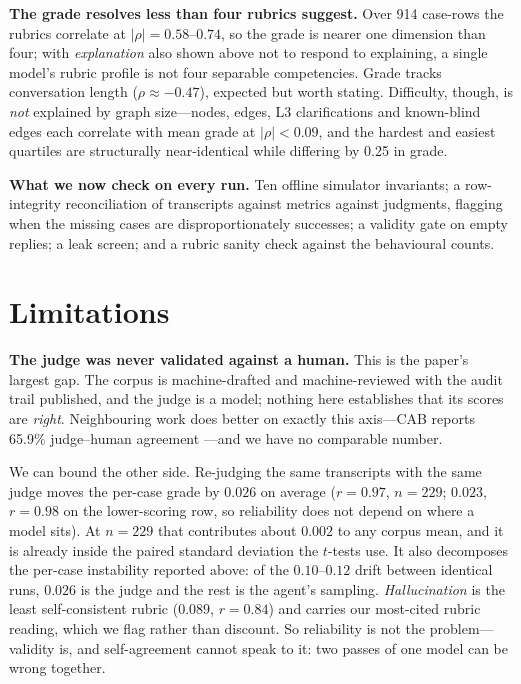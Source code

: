 \documentclass{article} %
\begin{document}
\textbf{The grade resolves less than four rubrics suggest.} Over 914
case-rows the rubrics correlate at $|\rho| = 0.58$--$0.74$, so the grade
is nearer one dimension than four; with \emph{explanation} also shown
above not to respond to explaining, a single model's rubric profile is
not four separable competencies. Grade tracks conversation length
($\rho \approx -0.47$), expected but worth stating. Difficulty, though,
is \emph{not} explained by graph size---nodes, edges, L3 clarifications
and known-blind edges each correlate with mean grade at $|\rho| < 0.09$,
and the hardest and easiest quartiles are structurally near-identical
while differing by 0.25 in grade.

\textbf{What we now check on every run.} Ten offline simulator
invariants; a row-integrity reconciliation of transcripts against metrics
against judgments, flagging when the missing cases are disproportionately
successes; a validity gate on empty replies; a leak screen; and a rubric
sanity check against the behavioural counts.

\section{Limitations}
\label{sec:limits}

\textbf{The judge was never validated against a human.} This is the
paper's largest gap. The corpus is machine-drafted and machine-reviewed
with the audit trail published, and the judge is a model; nothing here
establishes that its scores are \emph{right}. Neighbouring work does
better on exactly this axis---CAB reports 65.9\% judge--human agreement
\citep{cab2025}---and we have no comparable number.

We can bound the other side. Re-judging the same transcripts with the
same judge moves the per-case grade by $0.026$ on average ($r=0.97$,
$n=229$; $0.023$, $r=0.98$ on the lower-scoring row, so reliability does
not depend on where a model sits). At $n=229$ that contributes about
$0.002$ to any corpus mean, and it is already inside the paired standard
deviation the $t$-tests use. It also decomposes the per-case instability
reported above: of the $0.10$--$0.12$ drift between identical runs,
$0.026$ is the judge and the rest is the agent's sampling. \emph{Hallucination} is
the least self-consistent rubric ($0.089$, $r=0.84$) and carries our
most-cited rubric reading, which we flag rather than discount. So
reliability is not the problem---validity is, and self-agreement cannot
speak to it: two passes of one model can be wrong together.
\end{document}
